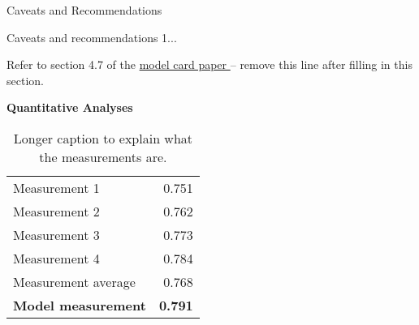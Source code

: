 \documentclass{article}
\begin{document}
\begin{adjustwidth}{-60pt}{-30pt}
\begin{singlespace}
\begin{tcolorbox}[title=\textbf{Model Card - CheXNet},
    breakable, sharp corners, boxrule=0.7pt]
{\begin{mcsection}{Caveats and Recommendations}
    \item Caveats and recommendations 1...
\end{mcsection}

Refer to section 4.7 of the \href{https://arxiv.org/abs/1810.03993}{model card paper } -- remove this line after filling in this section.

\textbf{Quantitative Analyses}

\begin{table}[H]
\centering
\small{
\begin{tabular}{lr}
Measurement 1       & 0.751  \\
Measurement 2       & 0.762 \\
Measurement 3       & 0.773 \\
Measurement 4       & 0.784 \\
Measurement average & 0.768  \\ \hline
\textbf{Model measurement}  & \textbf{0.791} \\ \hline
\end{tabular} } \\
\caption[Short caption used in list of tables.]{\small{Longer caption to explain what the measurements are.}}
\end{table}

} %
\end{tcolorbox}
\end{singlespace}
\end{adjustwidth}
\end{document}
